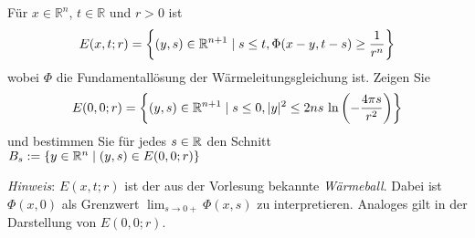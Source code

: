 \begin{exercisePage}
	\setcounter{taskcount}{17}
	
	\begin{task}
		Für $x\in\mathbb R^n$, $t\in \mathbb R$ und $r>0$ ist
		\begin{equation*}
			E(x,t;r) = \left\{(y,s)\in \mathbb{R}^{n+1}\mid s\leq t, \Phi(x-y,t-s)\geq \frac{1}{r^n}\right\}
		\end{equation*}
		wobei $\Phi$ die Fundamentallösung der Wärmeleitungsgleichung ist.
		Zeigen Sie
		\begin{equation*}
			E(0,0;r) =\left\{ (y,s)\in \mathbb{R}^{n+1}\mid s\leq 0, |y|^2\leq 2n s\ {\ln}\left(-\frac{4\pi s}{r^2}\right)\right\}
		\end{equation*}
		und bestimmen Sie für jedes $s\in \mathbb{R}$ den Schnitt $B_s := \{y\in \mathbb{R}^n \mid (y,s)\in E(0,0;r)\}$
		
		\textit{Hinweis}: $E(x,t;r)$ ist der aus der Vorlesung bekannte \textit{Wärmeball}. Dabei ist $\Phi(x,0)$ als Grenzwert $\lim_{ s\to 0+} \Phi(x,s)$ zu interpretieren. Analoges gilt in der Darstellung von $E(0,0;r)$.
	\end{task}


\end{exercisePage}
